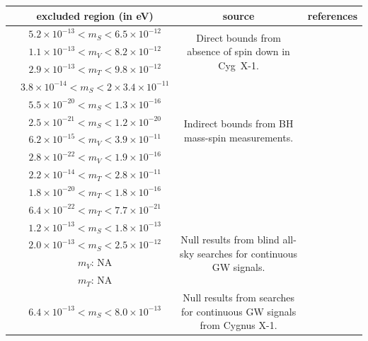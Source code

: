 \documentclass[11pt]{article}
\numberwithin{equation}{section} %
\begin{document}
\begin{table}
 \tiny
 \begin{tabular}{cccc}
  \hline
  \hline
 & excluded region (in eV)                         & source            & references\\
    \hline
{\bf *} &  $5.2\times10^{-13}<{m}_S<6.5\times 10^{-12}$       & \multirow{3}{*}{Direct bounds from 
absence of spin down in Cyg~X-1.}  &
\multirow{3}{*}{\cite{Cardoso:2018tly,Brito:2020lup}} \\
{\bf *} &  $1.1\times10^{-13}<{m}_V<8.2\times10^{-12}$    &   & \\
{\bf *} &  $2.9\times10^{-13}<{m}_T<9.8\times10^{-12}$    &   & \\
  \hline
&  $3.8\times 10^{-14}<{m}_S<2\times 3.4\times10^{-11}$ & \multirow{6}{*}{Indirect bounds from BH mass-spin measurements.}  
&
\multirow{3}{*}{\cite{Arvanitaki:2014wva,Pani:2012vp,Brito:2013wya,Baryakhtar:2017ngi}} \\
&   $5.5\times 10^{-20}<{m}_S<1.3\times 10^{-16}$ &    &\\
&   $2.5\times 10^{-21}<{m}_S<1.2\times 10^{-20}$ &    &\\
 &  $6.2\times 10^{-15}<{m}_V<3.9\times10^{-11}$     &   &  
\multirow{3}{*}{\cite{Brito:2017zvb,Stott:2018opm,
Cardoso:2018tly,Brito:2020lup,Stott:2020gjj,Unal:2020jiy}}\\
 &  $2.8\times 10^{-22}<{m}_V<  1.9\times 10^{-16}$ &    &\\
 &  $2.2\times 10^{-14}<{m}_T<  2.8\times10^{-11}$  &   & \\
 &  $1.8\times 10^{-20}<{m}_T<  1.8\times 10^{-16}$ &    &\\
 &  $6.4\times 10^{-22}<{m}_T<  7.7\times 10^{-21}$ &    &\\
  \hline 
&  $1.2\times 10^{-13}<{m}_S<1.8\times 10^{-13}$   & \multirow{4}{*}{Null results from blind all-sky searches for 
continuous GW signals.}  & \multirow{4}{*}{\cite{Palomba:2019vxe,Zhu:2020tht}} \\
&  $2.0\times 10^{-13}<{m}_S<2.5\times 10^{-12}$     &   & \\
&  ${m}_V$: NA     &   & \\
&  ${m}_T$: NA     &   & \\
  \hline
&  $6.4\times 10^{-13}<m_S<8.0\times 10^{-13}$     & \multirow{3}{*}{Null results from searches for continuous GW 
signals from Cygnus X-1.}  &
\multirow{3}{*}{\cite{Sun:2019mqb,Yoshino:2014wwa}} \\

\end{tabular}
\end{table}
\end{document}
